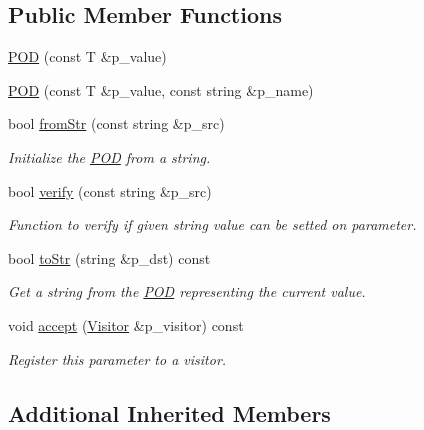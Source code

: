 \subsection*{Public Member Functions}
\begin{DoxyCompactItemize}
\item 
\hyperlink{classxtd_1_1servers_1_1param_1_1POD_a8f374c2b8622bdcec87a746b07bad388}{P\+OD} (const T \&p\+\_\+value)
\item 
\hyperlink{classxtd_1_1servers_1_1param_1_1POD_aec8808c77e41c5156828840c5764a0af}{P\+OD} (const T \&p\+\_\+value, const string \&p\+\_\+name)
\item 
bool \hyperlink{classxtd_1_1servers_1_1param_1_1POD_ac6754089526df6eb0eef539be830c668}{from\+Str} (const string \&p\+\_\+src)
\begin{DoxyCompactList}\small\item\em Initialize the \hyperlink{classxtd_1_1servers_1_1param_1_1POD}{P\+OD} from a string. \end{DoxyCompactList}\item 
bool \hyperlink{classxtd_1_1servers_1_1param_1_1POD_aded664a97a02450a9270dd04af042d0c}{verify} (const string \&p\+\_\+src)
\begin{DoxyCompactList}\small\item\em Function to verify if given string value can be setted on parameter. \end{DoxyCompactList}\item 
bool \hyperlink{classxtd_1_1servers_1_1param_1_1POD_a6b40b7e5cd208c4ab848edb753c612f7}{to\+Str} (string \&p\+\_\+dst) const 
\begin{DoxyCompactList}\small\item\em Get a string from the \hyperlink{classxtd_1_1servers_1_1param_1_1POD}{P\+OD} representing the current value. \end{DoxyCompactList}\item 
void \hyperlink{classxtd_1_1servers_1_1param_1_1POD_a828a1fa2391bc087f396b87a1d7c793a}{accept} (\hyperlink{classxtd_1_1servers_1_1param_1_1Visitor}{Visitor} \&p\+\_\+visitor) const 
\begin{DoxyCompactList}\small\item\em Register this parameter to a visitor. \end{DoxyCompactList}\end{DoxyCompactItemize}
\subsection*{Additional Inherited Members}



